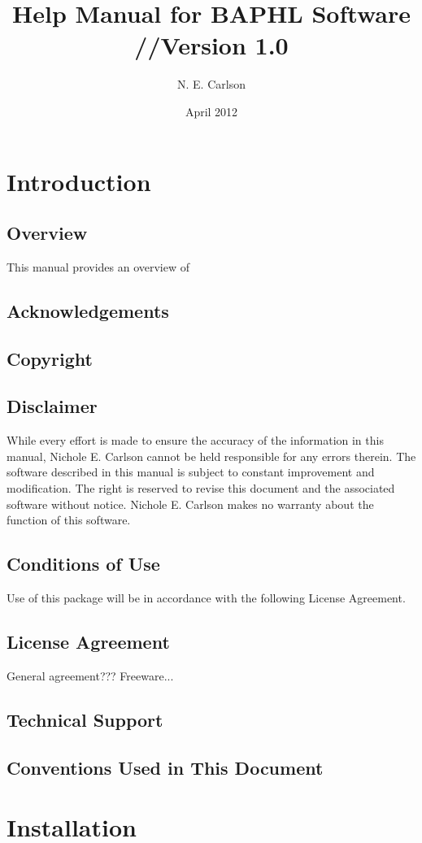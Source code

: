 \documentclass[11pt]{book}
\begin{document}
\author{N. E. Carlson}
\title{Help Manual for BAPHL Software //Version 1.0}
\date{April 2012}

\tableofcontents
\chapter{Introduction}
\section{Overview}
This manual provides an overview of
\section{Acknowledgements}
\section{Copyright}

\section{Disclaimer}
    While every effort is made to ensure the accuracy of the information in this manual, Nichole E. Carlson cannot be held responsible for any errors therein. The software described in this manual is subject to constant improvement and modification.  The right is reserved to revise this document and the associated software without notice.  Nichole E. Carlson makes no warranty about the function of this software.
\section{Conditions of Use}
    Use of this package will be in accordance with the following License Agreement.
\section{License Agreement}
    General agreement??? Freeware...
\section*{Technical Support}
\section*{Conventions Used in This Document}

\chapter{Installation}
\end{document}
